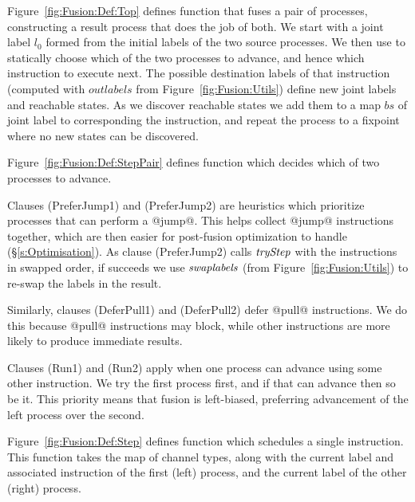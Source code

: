 



\smallskip
Figure~\ref{fig:Fusion:Def:Top} defines function  that fuses a pair of processes, constructing a result process that does the job of both. We start with a joint label $l_0$ formed from the initial labels of the two source processes. We then use  to statically choose which of the two processes to advance, and hence which instruction to execute next. The possible destination labels of that instruction (computed with $outlabels$ from Figure~\ref{fig:Fusion:Utils}) define new joint labels and reachable states. As we discover reachable states we add them to a map $bs$ of joint label to corresponding the instruction, and repeat the process to a fixpoint where no new states can be discovered.




Figure~\ref{fig:Fusion:Def:StepPair} defines function  which decides which of two processes to advance.

Clauses (PreferJump1) and (PreferJump2) are heuristics which prioritize processes that can perform a @jump@. This helps collect @jump@ instructions together, which are then easier for post-fusion optimization to handle (\S\ref{s:Optimisation}). As clause (PreferJump2) calls $\textit{tryStep}$ with the instructions in swapped order, if  succeeds we use $\textit{swaplabels}$ (from Figure~\ref{fig:Fusion:Utils}) to re-swap the labels in the result.

Similarly, clauses (DeferPull1) and (DeferPull2) defer @pull@ instructions. We do this because @pull@ instructions may block, while other instructions are more likely to produce immediate results.

Clauses (Run1) and (Run2) apply when one process can advance using some other instruction. We try the first process first, and if that can advance then so be it. This priority means that fusion is left-biased, preferring advancement of the left process over the second.




\smallskip
Figure~\ref{fig:Fusion:Def:Step} defines function  which schedules a single instruction. This function takes the map of channel types, along with the current label and associated instruction of the first (left) process, and the current label of the other (right) process.

